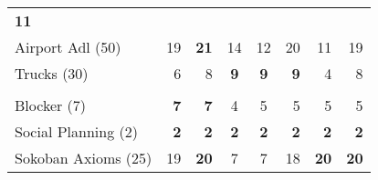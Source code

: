 \begin{tabular}{lrrccrrr}
    \textbf{11}                                                                                                                                                                         \\
    {Airport Adl} (50)               & 19                                       & \textbf{21}
                                            & 14                                       & 12
                                            & 20                                       & 11                                     & 19                                                    \\
    {Trucks} (30)                    & 6                                        & 8
                                            & \textbf{9}                               & \textbf{9}
                                            & \textbf{9}                               & 4
                                            & 8                                                                                                                                         \\
    \midrule
    & \multicolumn{7}{l}{\emph{\textcite{ivankovic-haslum-ijcai2015}}} \\
    {Blocker} (7)                    & \textbf{7}                               &
    \textbf{7}                              & 4                                        & 5
                                            & 5                                        & 5                                      & 5                                                     \\
    {Social Planning} (2)            & \textbf{2}                               &
    \textbf{2}                              & \textbf{2}                               & \textbf{2}
                                            & \textbf{2}                               & \textbf{2}                             & \textbf{2}                                            \\
    {Sokoban Axioms} (25)            & 19                                       & \textbf{20}
                                            & 7                                        & 7
                                            & 18                                       & \textbf{20}
                                            & \textbf{20}                                                                                                                               \\
    \midrule

\end{tabular}
